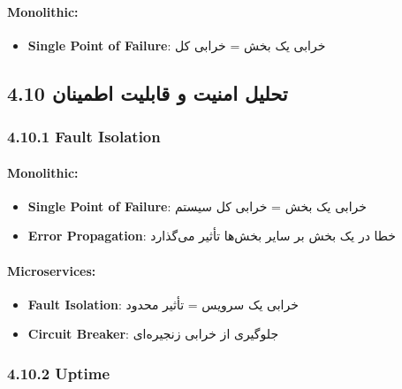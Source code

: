 \documentclass[
]{article}
\providecommand{\tightlist}{%
  \setlength{\itemsep}{0pt}\setlength{\parskip}{0pt}}
\begin{document}
\paragraph{Monolithic:}\label{monolithic}

\begin{itemize}
\tightlist
\item
  \textbf{Single Point of Failure}: خرابی یک بخش = خرابی کل
\end{itemize}

\subsection{4.10 تحلیل امنیت و قابلیت
اطمینان}\label{ux62aux62dux644ux6ccux644-ux627ux645ux646ux6ccux62a-ux648-ux642ux627ux628ux644ux6ccux62a-ux627ux637ux645ux6ccux646ux627ux646-1}

\subsubsection{4.10.1 Fault Isolation}\label{fault-isolation-1}

\paragraph{Monolithic:}\label{monolithic-1}

\begin{itemize}
\tightlist
\item
  \textbf{Single Point of Failure}: خرابی یک بخش = خرابی کل سیستم
\item
  \textbf{Error Propagation}: خطا در یک بخش بر سایر بخش‌ها تأثیر می‌گذارد
\end{itemize}

\paragraph{Microservices:}\label{microservices}

\begin{itemize}
\tightlist
\item
  \textbf{Fault Isolation}: خرابی یک سرویس = تأثیر محدود
\item
  \textbf{Circuit Breaker}: جلوگیری از خرابی زنجیره‌ای
\end{itemize}

\subsubsection{4.10.2 Uptime}\label{uptime}
\end{document}

